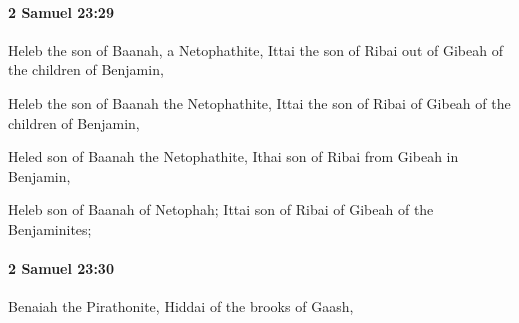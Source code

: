 		\paragraph{2 Samuel 23:29} %
			\label{2SAMUEL-23-29}

			Heleb the son of Baanah, a Netophathite, Ittai the son of Ribai out of Gibeah of the children of Benjamin,

			\begin{versebox}
					\item[BHS] 
					\item[ASV] Heleb the son of Baanah the Netophathite, Ittai the son of Ribai of Gibeah of the children of Benjamin,
					\item[NIV] Heled son of Baanah the Netophathite, Ithai son of Ribai from Gibeah in Benjamin,
					\item[NRSV] Heleb son of Baanah of Netophah; Ittai son of Ribai of Gibeah of the Benjaminites;
			\end{versebox}

		\paragraph{2 Samuel 23:30} %
			\label{2SAMUEL-23-30}

			Benaiah the Pirathonite, Hiddai of the brooks of Gaash,

